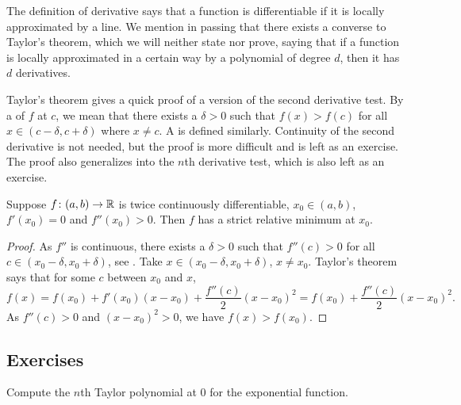 \medskip

The definition of derivative says that
a function is
differentiable if it
is locally approximated by a line.
We mention in passing that there exists a converse to Taylor's
theorem,
which we will neither state nor prove,
saying that if a function is
locally approximated in a certain way by a polynomial of degree $d$, then it
has $d$ derivatives.

\medskip

Taylor's theorem gives a quick proof of a version of
the second derivative test.
By a \emph{}
of $f$ at $c$,
we mean that there exists a $\delta > 0$ such that $f(x) > f(c)$ for
all $x \in (c-\delta,c+\delta)$ where $x\neq c$.
A \emph{}
is defined similarly.
Continuity of the second derivative is not needed, but the proof is more
difficult and is left as an exercise.  The proof also generalizes
into the $n$th derivative test, which is also left as
an exercise.

\begin{prop}
Suppose $f \colon (a,b) \to {\mathbb{R}}$ is twice continuously differentiable,
$x_0 \in (a,b)$, $f'(x_0) = 0$ and $f''(x_0) > 0$.  Then $f$ has a strict relative
minimum at $x_0$.
\end{prop}

\begin{proof}
As $f''$ is continuous, there exists a $\delta > 0$
such that $f''(c) > 0$ for all $c \in (x_0-\delta,x_0+\delta)$,
see .
Take $x \in (x_0-\delta,x_0+\delta)$, $x \neq x_0$.
Taylor's theorem says that for some $c$ between $x_0$ and $x$,
\begin{equation*}
f(x) 
=
f(x_0) + f'(x_0) (x-x_0) +
\frac{f''(c)}{2}{(x-x_0)}^{2} 
=
f(x_0) + \frac{f''(c)}{2}{(x-x_0)}^{2}  .
\end{equation*}
As $f''(c) > 0$ and ${(x-x_0)}^2 > 0$, we have $f(x) > f(x_0)$.
\end{proof}

\subsection{Exercises}

\begin{exercise}
Compute the $n$th Taylor polynomial at $0$ for the exponential function.
\end{exercise}

